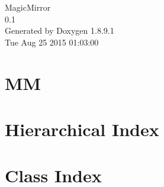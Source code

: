 \documentclass[twoside]{book}
\newcommand{\+}{\discretionary{\mbox{\scriptsize$\hookleftarrow$}}{}{}}
\newcommand{\clearemptydoublepage}{%
  \newpage{\pagestyle{empty}\cleardoublepage}%
}
\begin{document}
\hypersetup{pageanchor=false,
             bookmarks=true,
             bookmarksnumbered=true,
             pdfencoding=unicode
            }
\begin{titlepage}
\vspace*{7cm}
\begin{center}%
{\Large Magic\+Mirror \\[1ex]\large 0.\+1 }\\
\vspace*{1cm}
{\large Generated by Doxygen 1.8.9.1}\\
\vspace*{0.5cm}
{\small Tue Aug 25 2015 01:03:00}\\
\end{center}
\end{titlepage}
\clearemptydoublepage
\tableofcontents
\clearemptydoublepage
{}
\hypersetup{pageanchor=true}

\chapter{M\+M}
\label{md__r_e_a_d_m_e}
\hypertarget{md__r_e_a_d_m_e}{}

\chapter{Hierarchical Index}

\chapter{Class Index}

\end{document}

